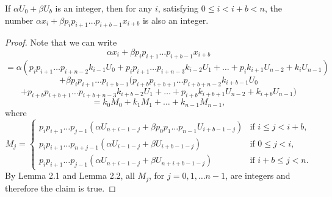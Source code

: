 \documentclass[10pt,a4paper]{amsart}
\begin{document}
\begin{theorem}{If $\alpha U_0+\beta U_b$ is an integer, then for any $i$, satisfying $0\le i<i+b< n$, the number $\alpha x_i+\beta p_i p_{i+1}\ldots p_{i+b-1} x_{i+b}$ is also an integer.}
\end{theorem}

\begin{proof} Note that we can write
$$
\alpha x_i+\beta p_i p_{i+1}\ldots p_{i+b-1} x_{i+b}
$$
$$
=\alpha (p_ip_{i+1}\ldots p_{i+n-2}k_{i-1}U_0+p_ip_{i+1}\ldots p_{i+n-3}k_{i-2}U_1+\ldots +p_ik_{i+1}U_{n-2}+k_iU_{n-1})
$$
$$
+\beta p_i p_{i+1}\ldots p_{i+b-1}(p_{i+b}p_{i+b+1}\ldots p_{i+b+n-2}k_{i+b-1}U_0
$$
$$
+p_{i+b}p_{i+b+1}\ldots p_{i+b+n-3}k_{i+b-2}U_1+\ldots +p_{i+b}k_{i+b+1} U_{n-2}+k_{i+b}U_{n-1})
$$ 
$$
=k_0M_0+k_1M_1+\ldots +k_{n-1}M_{n-1},
$$ 
where
$$
M_j=
    \begin{cases}
        p_i p_{i+1}\ldots p_{j-1} (\alpha U_{n+i-1-j}+\beta p_0 p_1\ldots p_{n-1} U_{i+b-1-j}) & \text{if } i\le j<i+b,\\
        p_i p_{i+1}\ldots p_{n+j-1} (\alpha U_{i-1-j}+\beta U_{i+b-1-j}) & \text{if } 0\le j<i,\\
        p_i p_{i+1}\ldots p_{j-1} (\alpha U_{n+i-1-j}+\beta U_{n+i+b-1-j}) & \text{if } i+b\le j<n.
    \end{cases}
$$
By Lemma 2.1 and Lemma 2.2, all $M_j$, for $j=0,1,\ldots n-1$, are integers and therefore the claim is true.
\end{proof}
\end{document}
